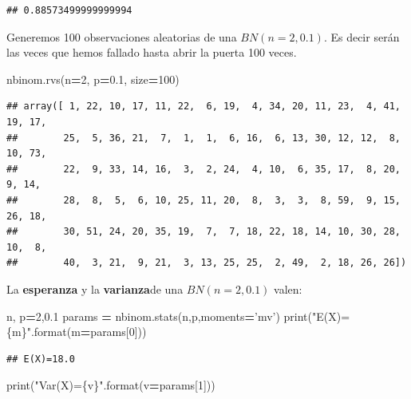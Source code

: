 \documentclass[]{book}
\newenvironment{Shaded}{\begin{snugshade}}{\end{snugshade}}
\newcommand{\BuiltInTok}[1]{#1}
\newcommand{\DecValTok}[1]{\textcolor[rgb]{0.00,0.00,0.81}{#1}}
\newcommand{\FloatTok}[1]{\textcolor[rgb]{0.00,0.00,0.81}{#1}}
\newcommand{\NormalTok}[1]{#1}
\newcommand{\OperatorTok}[1]{\textcolor[rgb]{0.81,0.36,0.00}{\textbf{#1}}}
\newcommand{\SpecialCharTok}[1]{\textcolor[rgb]{0.00,0.00,0.00}{#1}}
\newcommand{\StringTok}[1]{\textcolor[rgb]{0.31,0.60,0.02}{#1}}
\begin{document}
\begin{verbatim}
## 0.88573499999999994
\end{verbatim}

Generemos 100 observaciones aleatorias de una \(BN(n=2,0.1)\). Es decir serán las veces que hemos fallado hasta abrir la puerta 100 veces.

\begin{Shaded}
\begin{Highlighting}[]
\NormalTok{nbinom.rvs(n}\OperatorTok{=}\DecValTok{2}\NormalTok{, p}\OperatorTok{=}\FloatTok{0.1}\NormalTok{, size}\OperatorTok{=}\DecValTok{100}\NormalTok{)}
\end{Highlighting}
\end{Shaded}

\begin{verbatim}
## array([ 1, 22, 10, 17, 11, 22,  6, 19,  4, 34, 20, 11, 23,  4, 41, 19, 17,
##        25,  5, 36, 21,  7,  1,  1,  6, 16,  6, 13, 30, 12, 12,  8, 10, 73,
##        22,  9, 33, 14, 16,  3,  2, 24,  4, 10,  6, 35, 17,  8, 20,  9, 14,
##        28,  8,  5,  6, 10, 25, 11, 20,  8,  3,  3,  8, 59,  9, 15, 26, 18,
##        30, 51, 24, 20, 35, 19,  7,  7, 18, 22, 18, 14, 10, 30, 28, 10,  8,
##        40,  3, 21,  9, 21,  3, 13, 25, 25,  2, 49,  2, 18, 26, 26])
\end{verbatim}

La \textbf{esperanza} y la \textbf{varianza}de una \(BN(n=2,0.1)\) valen:

\begin{Shaded}
\begin{Highlighting}[]
\NormalTok{n, p}\OperatorTok{=}\DecValTok{2}\NormalTok{,}\FloatTok{0.1}
\NormalTok{params }\OperatorTok{=}\NormalTok{ nbinom.stats(n,p,moments}\OperatorTok{=}\StringTok{'mv'}\NormalTok{)}
\BuiltInTok{print}\NormalTok{(}\StringTok{"E(X)=}\SpecialCharTok{\{m\}}\StringTok{"}\NormalTok{.}\BuiltInTok{format}\NormalTok{(m}\OperatorTok{=}\NormalTok{params[}\DecValTok{0}\NormalTok{]))}
\end{Highlighting}
\end{Shaded}

\begin{verbatim}
## E(X)=18.0
\end{verbatim}

\begin{Shaded}
\begin{Highlighting}[]
\BuiltInTok{print}\NormalTok{(}\StringTok{"Var(X)=}\SpecialCharTok{\{v\}}\StringTok{"}\NormalTok{.}\BuiltInTok{format}\NormalTok{(v}\OperatorTok{=}\NormalTok{params[}\DecValTok{1}\NormalTok{]))}
\end{Highlighting}
\end{Shaded}
\end{document}

